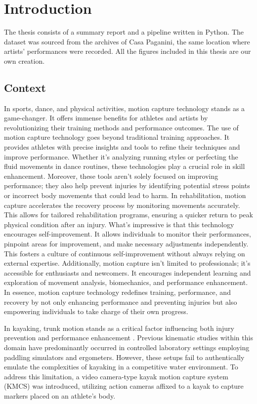 \chapter{Introduction}
The thesis consists of a summary report and a pipeline written in Python.
The dataset was sourced from the archives of Casa Paganini, the same location where artists' performances were recorded. 
All the figures included in this thesis are our own creation.

\section{Context}
In sports, dance, and physical activities, motion capture technology stands as a game-changer.
It offers immense benefits for athletes and artists by revolutionizing their training methods and performance outcomes.
The use of motion capture technology goes beyond traditional training approaches.
It provides athletes with precise insights and tools to refine their techniques and improve performance.
Whether it's analyzing running styles or perfecting the fluid movements in dance routines, these technologies play a crucial role in skill enhancement.
Moreover, these tools aren't solely focused on improving performance; they also help prevent injuries by identifying potential stress points or incorrect body movements that could lead to harm.
In rehabilitation, motion capture accelerates the recovery process by monitoring movements accurately. This allows for tailored rehabilitation programs, ensuring a quicker return to peak physical condition after an injury.
What's impressive is that this technology encourages self-improvement.
It allows individuals to monitor their performances, pinpoint areas for improvement, and make necessary adjustments independently. This fosters a culture of continuous self-improvement without always relying on external expertise.
Additionally, motion capture isn't limited to professionals; it's accessible for enthusiasts and newcomers. It encourages independent learning and exploration of movement analysis, biomechanics, and performance enhancement.
In essence, motion capture technology redefines training, performance, and recovery by not only enhancing performance and preventing injuries but also empowering individuals to take charge of their own progress.


In kayaking, trunk motion stands as a critical factor influencing both injury prevention and performance enhancement \cite{kayak}.
Previous kinematic studies within this domain have predominantly occurred in controlled laboratory settings employing paddling simulators and ergometers.
However, these setups fail to authentically emulate the complexities of kayaking in a competitive water environment.
To address this limitation, a video camera-type kayak motion capture system (KMCS) was introduced, utilizing action cameras affixed to a kayak to capture markers placed on an athlete's body.

